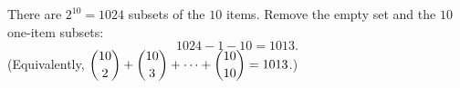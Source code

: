 There are $2^{10}=1024$ subsets of the $10$ items. Remove the empty set and the $10$ one-item subsets:
\[
1024-1-10=\boxed{1013}.
\]
(Equivalently, $\dbinom{10}{2}+\dbinom{10}{3}+\cdots+\dbinom{10}{10}=1013$.)
